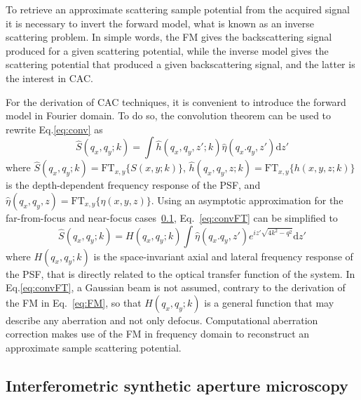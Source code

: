 To retrieve an approximate scattering sample potential from the acquired signal it is necessary to invert the forward model, what is known as an inverse scattering problem. In simple words, the FM gives the backscattering signal produced for a given scattering potential, while the inverse model gives the scattering potential that produced a given backscattering signal, and the latter is the interest in CAC.

For the derivation of CAC techniques, it is convenient to introduce the forward model in Fourier domain. To do so, the convolution theorem can be used to rewrite Eq.\eqref{eq:conv} as
\begin{equation}\label{eq:convFT}
    \hat{S}(q_x, q_y; k) = \int \hat{h}(q_x, q_y, z'; k) \hat{\eta}(q_x. q_y, z') \text{d}z'
\end{equation}
where $\hat{S}(q_x, q_y; k)=\text{FT}_{x,y}\{S(x,y;k)\}$, $\hat{h}(q_x, q_y, z; k)=\text{FT}_{x,y}\{h(x,y,z;k)\}$ is the depth-dependent frequency response of the PSF, and $\hat{\eta}(q_x, q_y, z)=\text{FT}_{x,y}\{\eta(x,y,z)\}$. Using an asymptotic approximation for the far-from-focus and near-focus cases~\ref{}, Eq.~\eqref{eq:convFT} can be simplified to
\begin{equation}\label{eq:FMft}
    \hat{S}(q_x, q_y; k) = H(q_x, q_y; k) \int \hat{\eta}(q_x. q_y, z') e^{iz'\sqrt{4k^2-q^2}} \text{d}z'
\end{equation}
where $H(q_x, q_y; k)$ is the space-invariant axial and lateral frequency response of the PSF, that is directly related to the optical transfer function of the system. In Eq.\eqref{eq:convFT}, a Gaussian beam is not assumed, contrary to the derivation of the FM in Eq.~\eqref{eq:FM}, so that $H(q_x, q_y; k)$ is a general function that may describe any aberration and not only defocus. Computational aberration correction makes use of the FM in frequency domain to reconstruct an approximate sample scattering potential.

\subsection{Interferometric synthetic aperture microscopy}


